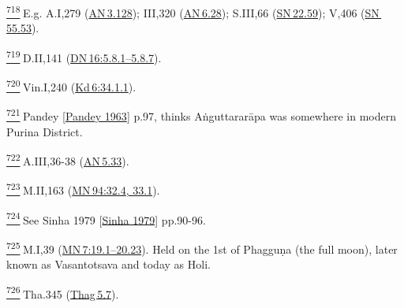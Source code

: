 \label{footprints_split_025.html_fn718}
\hyperref[footprints_split_019.htmlux5cux23fnref718]{\textsuperscript{718}} E.g.
A.I,279 (\href{https://suttacentral.net/an3.128/en/sujato}{AN\,3.128});
III,320 (\href{https://suttacentral.net/an6.28/en/sujato}{AN\,6.28});
S.III,66 (\href{https://suttacentral.net/sn22.59/en/sujato}{SN\,22.59});
V,406 (\href{https://suttacentral.net/sn55.53/en/sujato}{SN\,55.53}).

\label{footprints_split_025.html_fn719}
\hyperref[footprints_split_019.htmlux5cux23fnref719]{\textsuperscript{719}} D.II,141
(\href{https://suttacentral.net/dn16/en/sujato\#5.8.1}{DN\,16:5.8.1--5.8.7}).

\label{footprints_split_025.html_fn720}
\hyperref[footprints_split_019.htmlux5cux23fnref720]{\textsuperscript{720}} Vin.I,240
(\href{https://suttacentral.net/pli-tv-kd6/en/brahmali\#34.1.1}{Kd\,6:34.1.1}).

\label{footprints_split_025.html_fn721}
\hyperref[footprints_split_019.htmlux5cux23fnref721]{\textsuperscript{721}} {Pandey
{{[}\hyperref[footprints_split_022.htmlux5cux23Pandeyux5cux25201963]{Pandey
1963}{]}}} p.97, thinks Aṅguttararāpa was somewhere in modern Purina
District.

\label{footprints_split_025.html_fn722}
\hyperref[footprints_split_019.htmlux5cux23fnref722]{\textsuperscript{722}} A.III,36-38
(\href{https://suttacentral.net/an5.33/en/sujato}{AN\,5.33}).

\label{footprints_split_025.html_fn723}
\hyperref[footprints_split_019.htmlux5cux23fnref723]{\textsuperscript{723}} M.II,163
(\href{https://suttacentral.net/mn94/en/sujato\#32.4}{MN\,94:32.4,
33.1}).

\label{footprints_split_025.html_fn724}
\hyperref[footprints_split_019.htmlux5cux23fnref724]{\textsuperscript{724}} See
{Sinha 1979
{{[}\hyperref[footprints_split_022.htmlux5cux23Sinhaux5cux25201979]{Sinha
1979}{]}}} pp.90-96.

\label{footprints_split_025.html_fn725}
\hyperref[footprints_split_019.htmlux5cux23fnref725]{\textsuperscript{725}} M.I,39
(\href{https://suttacentral.net/mn7/en/sujato\#19.1}{MN\,7:19.1--20.23}).
Held on the 1{st} of Phagguṇa (the full moon), later known as
Vasantotsava and today as Holi.

\label{footprints_split_025.html_fn726}
\hyperref[footprints_split_019.htmlux5cux23fnref726]{\textsuperscript{726}} Tha.345
(\href{https://suttacentral.net/thag5.7/en/sujato}{Thag\,5.7}).

